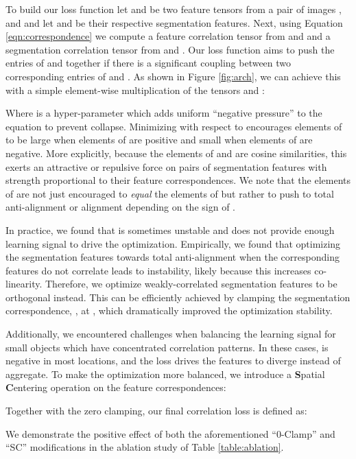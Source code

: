 \documentclass{article} \usepackage{iclr2022_conference,times}
\begin{document}
To build our loss function let  and  be two feature tensors from a pair of images , and  and let  and  be their respective segmentation features. Next, using Equation \ref{eqn:correspondence} we compute a feature correlation tensor  from  and  and a segmentation correlation tensor  from  and . Our loss function aims to push the entries of  and  together if there is a significant coupling between two corresponding entries of  and . As shown in Figure \ref{fig:arch}, we can achieve this with a simple element-wise multiplication of the tensors  and :

Where  is a hyper-parameter which adds uniform ``negative pressure'' to the equation to prevent collapse. Minimizing  with respect to  encourages elements of  to be large when elements of  are positive and small when elements of  are negative. More explicitly, because the elements of  and  are cosine similarities, this exerts an attractive or repulsive force on pairs of segmentation features with strength proportional to their feature correspondences. We note that the elements of  are not just encouraged to \textit{equal} the elements of  but rather to push to total anti-alignment  or alignment  depending on the sign of . 

In practice, we found that  is sometimes unstable and does not provide enough learning signal to drive the optimization. Empirically, we found that optimizing the segmentation features towards total anti-alignment when the corresponding features do not correlate leads to instability, likely because this increases co-linearity. Therefore, we optimize weakly-correlated segmentation features to be orthogonal instead. This can be efficiently achieved by clamping the segmentation correspondence, , at , which dramatically improved the optimization stability.

Additionally, we encountered challenges when balancing the learning signal for small objects which have concentrated correlation patterns. In these cases,  is negative in most locations, and the loss drives the features to diverge instead of aggregate. To make the optimization more balanced, we introduce a \textbf{S}patial \textbf{C}entering operation on the feature correspondences:


Together with the zero clamping, our final correlation loss is defined as:

We demonstrate the positive effect of both the aforementioned ``0-Clamp'' and ``SC'' modifications in the ablation study of Table \ref{table:ablation}.
\end{document}

